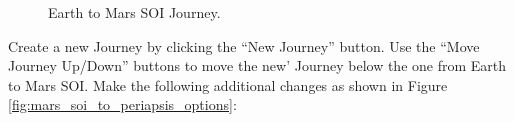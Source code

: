 \documentclass[11pt]{article}
\begin{document}
\begin{figure}[H]
	\centering
	\caption{\label{fig:earth_to_mars_soi_options}Earth to Mars \ac{SOI} Journey.}
\end{figure}


\noindent Create a new Journey by clicking the ``New Journey'' button. Use the ``Move Journey Up/Down'' buttons to move the new' Journey below the one from Earth to Mars \ac{SOI}. Make the following additional changes as shown in Figure \ref{fig:mars_soi_to_periapsis_options}:
\end{document}
